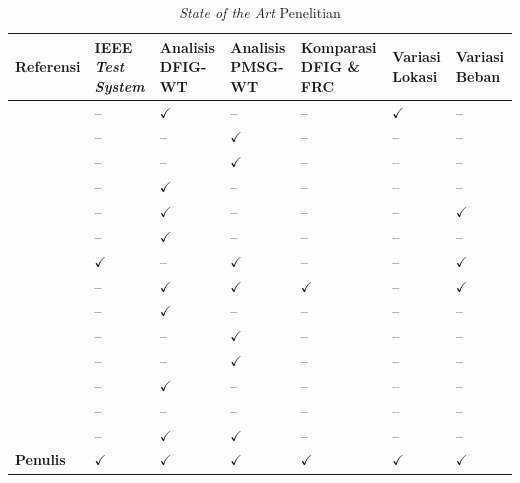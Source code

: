 \begin{table}[H]
\centering
\caption{\textit{State of the Art} Penelitian}
\label{tab:state-of-art}
\footnotesize
\begin{tabular}{p{2cm}
  >{\centering\arraybackslash}p{1.1cm}
  >{\centering\arraybackslash}p{1.2cm}
  >{\centering\arraybackslash}p{1.1cm}
  >{\centering\arraybackslash}p{1.5cm}
  >{\centering\arraybackslash}p{1.2cm}
  >{\centering\arraybackslash}p{1.3cm}}
\toprule
\textbf{Referensi} &
\textbf{IEEE \textit{Test System}} &
\textbf{Analisis DFIG-WT} &
\textbf{Analisis PMSG-WT} &
\textbf{Komparasi DFIG \& FRC} &
\textbf{Variasi Lokasi} &
\textbf{Variasi Beban} \\
\midrule
\cite{gautam2009impact}   & --           & $\checkmark$ & --           & --           & $\checkmark$ & --           \\
\cite{knuppel2009small}  & --           & --           & $\checkmark$ & --           & --           & --           \\
\cite{wu2009small}       & --           & --           & $\checkmark$ & --           & --           & --           \\
\cite{sun2013small}      & --           & $\checkmark$ & --           & --           & --           & --           \\
\cite{liu2014impact}     & --           & $\checkmark$ & --           & --           & --           & $\checkmark$ \\
\cite{mehta2014}         & --           & $\checkmark$ & --           & --           & --           & --           \\
\cite{wang2014small}     & $\checkmark$ & --           & $\checkmark$ & --           & --           & $\checkmark$ \\
\cite{he2015investigation} & --           & $\checkmark$ & $\checkmark$ & $\checkmark$ & --           & $\checkmark$ \\
\cite{pepiciello2022impact}& --           & $\checkmark$ & --           & --           & --           & --           \\
\cite{luo2021converter}   & --           & --           & $\checkmark$ & --           & --           & --           \\
\cite{li2024smallsignal}  & --           & --           & $\checkmark$ & --           & --           & --           \\
\cite{nirala2025impact}   & --           & $\checkmark$ & --           & --           & --           & --           \\
\cite{jin2024analysis}    & --           & --           & --           & --           & --           & --           \\
\cite{mostafa2023recent}  & --           & $\checkmark$ & $\checkmark$ & --           & --           & --           \\
\midrule
\textbf{Penulis}                            & $\checkmark$ & $\checkmark$ & $\checkmark$ & $\checkmark$ & $\checkmark$ & $\checkmark$ \\
\bottomrule
\end{tabular}
\end{table}

